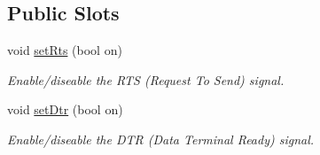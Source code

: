 \subsection*{Public Slots}
\begin{DoxyCompactItemize}
\item 
void \hyperlink{classmdt_serial_port_af0534e9f2e25b44a1a127d2a34b409fb}{setRts} (bool on)
\begin{DoxyCompactList}\small\item\em Enable/diseable the RTS (Request To Send) signal. \end{DoxyCompactList}\item 
void \hyperlink{classmdt_serial_port_a91ec8a600f09b6844d36902fe1e16592}{setDtr} (bool on)
\begin{DoxyCompactList}\small\item\em Enable/diseable the DTR (Data Terminal Ready) signal. \end{DoxyCompactList}\end{DoxyCompactItemize}
